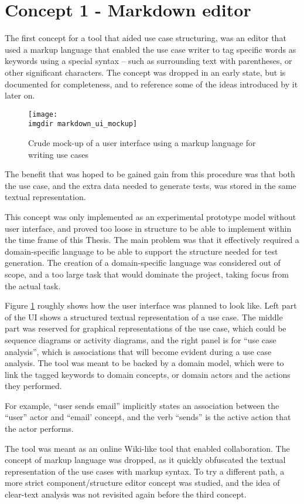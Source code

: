 \section{Concept 1 - Markdown editor}
The first concept for a tool that aided use case structuring, was an editor that used a markup language that enabled the use case writer to tag specific words as keywords using a special syntax -- such as surrounding text with parentheses, or other significant characters. The concept was dropped in an early state, but is documented for completeness, and to reference some of the ideas introduced by it later on.\medskip
\begin{figure}[!htbp]
  \centering
  \texttt{[image: \\imgdir markdown\_ui\_mockup]}
  \caption{Crude mock-up of a user interface using a markup language for writing use cases}
\label{fig:markdown_ui_mockup}
\end{figure}
\noindent The benefit that was hoped to be gained gain from this procedure was that both the use case, and the extra data needed to generate tests, was stored in the same textual representation.\medskip

\noindent This concept was only implemented as an experimental prototype model without user interface, and proved too loose in structure to be able to implement within the time frame of this Thesis. The main problem was that it effectively required a domain-specific language to be able to support the structure needed for test generation. The creation of a domain-specific language was considered out of scope, and a too large task that would dominate the project, taking focus from the actual task.\medskip

\noindent Figure \ref{fig:markdown_ui_mockup} roughly shows how the user interface was planned to look like. Left part of the UI shows a structured textual representation of a use case. The middle part was reserved for graphical representations of the use case, which could be sequence diagrams or activity diagrams, and the right panel is for ``use case analysis'', which is associations that will become evident during a use case analysis. The tool was meant to be backed by a domain model, which were to link the tagged keywords to domain concepts, or domain actors and the actions they performed.\medskip

\noindent For example, ``user sends email'' implicitly states an association between the ``user'' actor and ``email' concept, and the verb ``sends'' is the active action that the actor performs.\medskip

\noindent The tool was meant as an online Wiki-like tool that enabled collaboration. The concept of markup language was dropped, as it quickly obfuscated the textual representation of the use cases with markup syntax. To try a different path, a more strict component/structure editor concept was studied, and the idea of clear-text analysis was not revisited again before the third concept.

